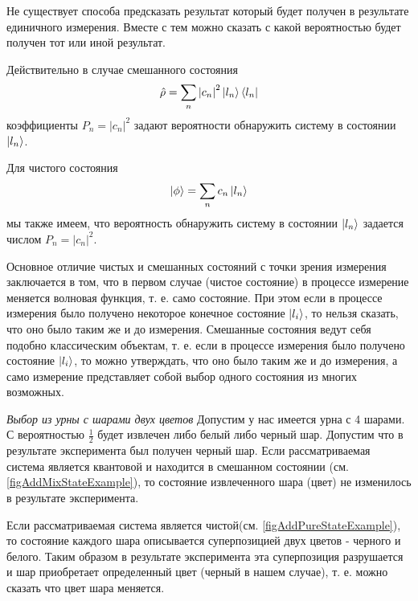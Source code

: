 Не существует способа предсказать результат который будет получен в
результате единичного измерения. Вместе с тем можно сказать с какой
вероятностью будет получен тот или иной результат.

Действительно в случае смешанного состояния
\begin{equation}
\hat{\rho} = 
\sum_n \left|c_n\right|^2 \ket{l_n}\bra{l_n}
\nonumber
\end{equation}
коэффициенты $P_n = \left|c_n\right|^2$
задают вероятности обнаружить систему в состоянии $\ket{l_n}$. 

Для чистого состояния
\begin{equation}
\left| \phi \right> = 
\sum_n c_n \ket{l_n}
\nonumber
\end{equation}
мы также имеем, что вероятность обнаружить систему в состоянии
$\ket{l_n}$ задается числом $P_n = \left|c_n\right|^2$. 

Основное отличие чистых и смешанных состояний с точки зрения измерения
заключается в том, что в первом случае (чистое состояние) в процессе
измерение меняется волновая функция, т. е. само состояние. При этом
если в процессе измерения было получено некоторое конечное состояние
$\ket{l_i}$, то нельзя сказать, что оно было таким же и до
измерения. Смешанные состояния ведут себя подобно классическим объектам,
т. е. если в процессе измерения было получено состояние
$\ket{l_i}$, то можно утверждать, что оно было таким же и до
измерения, а само измерение представляет собой выбор
одного состояния из многих возможных.

\begin{example}
\emph{Выбор из урны с шарами двух цветов}
Допустим у нас имеется урна с 4 шарами. С вероятностью $\frac{1}{2}$
будет извлечен либо белый либо черный шар. Допустим что в результате
эксперимента был получен черный шар. Если рассматриваемая система
является квантовой и находится в смешанном состоянии 
(см. \autoref{figAddMixStateExample}), то состояние
извлеченного шара (цвет) не изменилось в результате эксперимента. 




Если рассматриваемая система является
чистой(см. \autoref{figAddPureStateExample}), то состояние каждого
шара описывается суперпозицией двух цветов - черного и белого. Таким
образом в результате эксперимента эта суперпозиция разрушается и шар
приобретает определенный цвет (черный в нашем случае), т. е. можно
сказать что цвет шара меняется.
\end{example}
